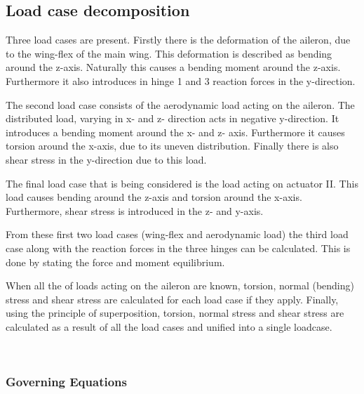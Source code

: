 \subsection{Load case decomposition}
\label{subsec:load_decomposition}
Three load cases are present. Firstly there is the deformation of the aileron, due to the wing-flex of the main wing. This deformation is described as bending around the z-axis. Naturally this causes a bending moment around the z-axis. Furthermore it also introduces in hinge 1 and 3 reaction forces in the y-direction.
\par
The second load case consists of the aerodynamic load acting on the aileron. The distributed load, varying in x- and z- direction acts in negative y-direction. It introduces a bending moment around the x- and z- axis. Furthermore it causes torsion around the x-axis, due to its uneven distribution. Finally there is also shear stress in the y-direction due to this load.
\par
The final load case that is being considered is the load acting on actuator II. This load causes bending around the z-axis and torsion around the x-axis. Furthermore, shear stress is introduced in the z- and y-axis.
\par
From these first two load cases (wing-flex and aerodynamic load) the third load case along with the reaction forces in the three hinges can be calculated. This is done by stating the force and moment equilibrium.

When all the of loads acting on the aileron are known, torsion, normal (bending) stress and shear stress are calculated for each load case if they apply. Finally, using the principle of superposition, torsion, normal stress and shear stress are calculated as a result of all the load cases and unified into a single loadcase.

\
\subsubsection{Governing Equations}
\label{subsubsec:gov_eq_numerical}


